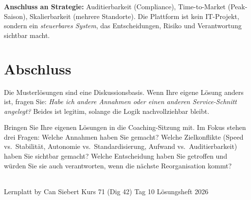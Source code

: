 \documentclass[11pt,a4paper,oneside]{article}
\begin{document}
\begin{loesungbox}
\smallskip
\textbf{Anschluss an Strategie:} Auditierbarkeit (Compliance), Time-to-Market (Peak-Saison), Skalierbarkeit (mehrere Standorte). Die Plattform ist kein IT-Projekt, sondern ein \emph{steuerbares System}, das Entscheidungen, Risiko und Verantwortung sichtbar macht.
\end{loesungbox}

\clearpage

\section*{Abschluss}
\thispagestyle{plain}

\noindent Die Musterl\"osungen sind eine Diskussionsbasis. Wenn Ihre eigene L\"osung anders ist, fragen Sie: \emph{Habe ich andere Annahmen \textendash{} oder einen anderen Service-Schnitt angelegt?} Beides ist legitim, solange die Logik nachvollziehbar bleibt.

\medskip
\begin{infobox}
Bringen Sie Ihre eigenen L\"osungen in die Coaching-Sitzung mit. Im Fokus stehen drei Fragen: Welche Annahmen haben Sie gemacht? Welche Zielkonflikte (Speed vs.\ Stabilit\"at, Autonomie vs.\ Standardisierung, Aufwand vs.\ Auditierbarkeit) haben Sie sichtbar gemacht? Welche Entscheidung haben Sie getroffen \textendash{} und w\"urden Sie sie auch verantworten, wenn die n\"achste Reorganisation kommt?
\end{infobox}

\vspace{1cm}
\noindent{\color{lpAccent}\rule{\linewidth}{0.6pt}}\\[4pt]
{\footnotesize\sffamily\color{lpGray}Lernplatt \textperiodcentered{} by Can Siebert \textperiodcentered{} Kurs 71 (Dig 42) \textperiodcentered{} Tag 10 \textperiodcentered{} L\"osungsheft \textperiodcentered{} \textcopyright{} 2026}
\end{document}

